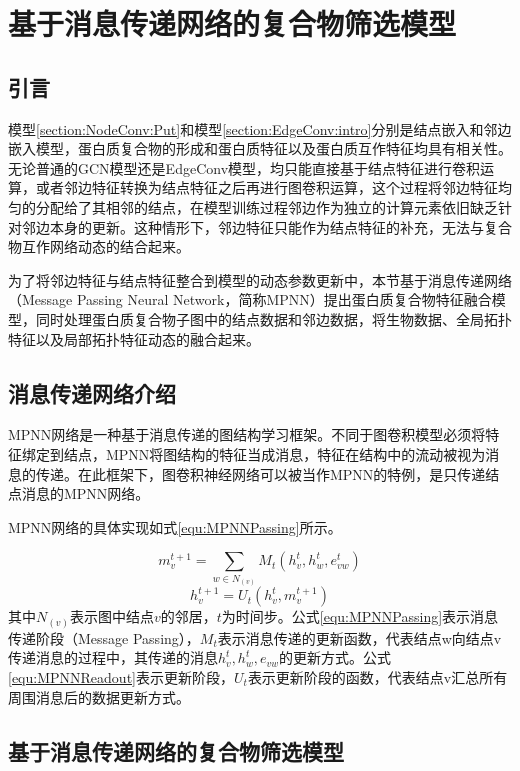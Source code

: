 \chapter{基于消息传递网络的复合物筛选模型}
\label{chapter:MPNN}
\section{引言}
\label{section:MPNN:Put}

模型\ref{section:NodeConv:Put}和模型\ref{section:EdgeConv:intro}分别是结点嵌入和邻边嵌入模型，蛋白质复合物的形成和蛋白质特征以及蛋白质互作特征均具有相关性。
无论普通的GCN模型还是EdgeConv模型，均只能直接基于结点特征进行卷积运算，或者邻边特征转换为结点特征之后再进行图卷积运算，这个过程将邻边特征均匀的分配给了其相邻的结点，在模型训练过程邻边作为独立的计算元素依旧缺乏针对邻边本身的更新。这种情形下，邻边特征只能作为结点特征的补充，无法与复合物互作网络动态的结合起来。

为了将邻边特征与结点特征整合到模型的动态参数更新中，本节基于消息传递网络（Message Passing Neural Network，简称MPNN）提出蛋白质复合物特征融合模型，同时处理蛋白质复合物子图中的结点数据和邻边数据，将生物数据、全局拓扑特征以及局部拓扑特征动态的融合起来。
\section{消息传递网络介绍}
\label{section:MPNN:intro}

MPNN网络是一种基于消息传递的图结构学习框架。不同于图卷积模型必须将特征绑定到结点，MPNN将图结构的特征当成消息，特征在结构中的流动被视为消息的传递。在此框架下，图卷积神经网络可以被当作MPNN的特例，是只传递结点消息的MPNN网络。


MPNN网络的具体实现如式\ref{equ:MPNNPassing}所示。

\begin{equation}
    \label{equ:MPNNPassing}
    m_v^{t+1} = \sum_{w \in N_{(v)}}M_t(h_v^t,h_w^t,e_{vw}^t)
\end{equation}
\begin{equation}
    \label{equ:MPNNReadout}
    h_v^{t+1} = U_t(h_v^t,m_v^{t+1})
\end{equation}
其中$N_{(v)}$表示图中结点$v$的邻居，$t$为时间步。公式\ref{equ:MPNNPassing}表示消息传递阶段（Message Passing），$M_t$表示消息传递的更新函数，代表结点w向结点v传递消息的过程中，其传递的消息$h_v^t,h_w^t,e_{vw}$的更新方式。公式\ref{equ:MPNNReadout}表示更新阶段，$U_t$表示更新阶段的函数，代表结点v汇总所有周围消息后的数据更新方式。


\section{基于消息传递网络的复合物筛选模型}
\label{section:MPNN:detail}

